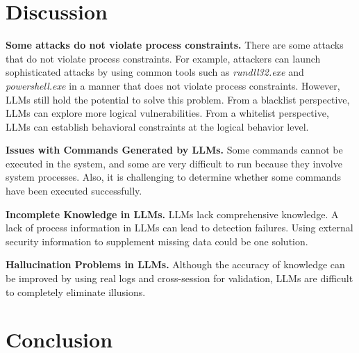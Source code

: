 
\section{Discussion}

\noindent
{\bf Some attacks do not violate process constraints.}
There are some attacks that do not violate process constraints. For example, attackers can launch sophisticated attacks by using common tools such as \textit{rundll32.exe} and \textit{powershell.exe} in a manner that does not violate process constraints. However, LLMs still hold the potential to solve this problem. From a blacklist perspective, LLMs can explore more logical vulnerabilities. From a whitelist perspective, LLMs can establish behavioral constraints at the logical behavior level.

\noindent
{\bf Issues with Commands Generated by LLMs.}
Some commands cannot be executed in the system, and some are very difficult to run because they involve system processes. Also, it is challenging to determine whether some commands have been executed successfully.

\noindent
{\bf Incomplete Knowledge in LLMs.}
LLMs lack comprehensive knowledge. A lack of process information in LLMs can lead to detection failures. Using external security information to supplement missing data could be one solution.

\noindent
{\bf Hallucination Problems in LLMs.}
Although the accuracy of knowledge can be improved by using real logs and cross-session for validation, LLMs are difficult to completely eliminate illusions.


\section{Conclusion}